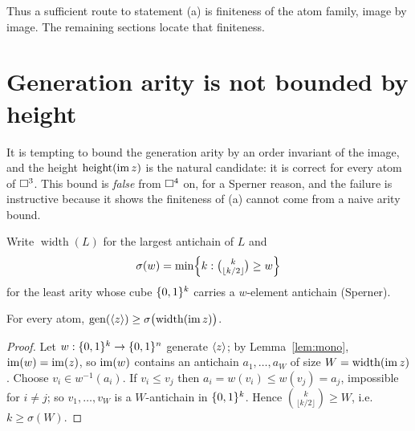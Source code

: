 Thus a sufficient route to statement \textup{(a)} is finiteness of the
atom family, image by image.  The remaining sections locate that
finiteness.

\section{Generation arity is not bounded by height}

It is tempting to bound the generation arity by an order invariant of the
image, and the height $\operatorname{height}(\operatorname{im} z)$ is the natural candidate: it is
correct for every atom of $\square^3$.  This bound is \emph{false} from
$\square^4$ on, for a Sperner reason, and the failure is instructive
because it shows the finiteness of \textup{(a)} cannot come from a naive
arity bound.

Write $\operatorname{width}(L)$ for the largest antichain of $L$ and
\[
  \sigma(w)=\min\Bigl\{k:\tbinom{k}{\lfloor k/2\rfloor}\ge w\Bigr\}
\]
for the least arity whose cube $\{0,1\}^k$ carries a $w$-element antichain
(Sperner).

\begin{prop}\label{prop:genwidth}
  For every atom, $\operatorname{gen}(\langle z \rangle)\ge\sigma\bigl(\operatorname{width}(\operatorname{im}
  z)\bigr)$.
\end{prop}
\begin{proof}
  Let $w:\{0,1\}^k\to\{0,1\}^n$ generate $\langle z \rangle$; by Lemma~\ref{lem:mono},
  $\operatorname{im}(w)=\operatorname{im}(z)$, so $\operatorname{im}(w)$ contains an antichain
  $a_1,\dots,a_{W}$ of size $W=\operatorname{width}(\operatorname{im} z)$.  Choose
  $v_i\in w^{-1}(a_i)$.  If $v_i\le v_j$ then $a_i=w(v_i)\le w(v_j)=a_j$,
  impossible for $i\ne j$; so $v_1,\dots,v_W$ is a $W$-antichain in
  $\{0,1\}^k$.  Hence $\binom{k}{\lfloor k/2\rfloor}\ge W$, i.e.\
  $k\ge\sigma(W)$.
\end{proof}

